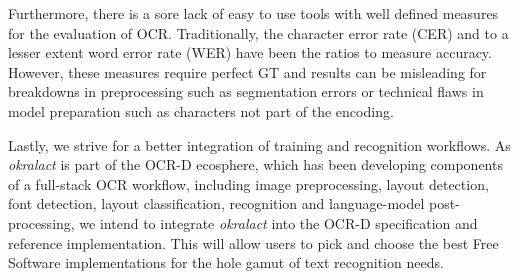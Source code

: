 \documentclass[conference]{IEEEtran}
\begin{document}

Furthermore, there is a sore lack of easy to use tools with well
defined measures for the evaluation of OCR. Traditionally, the
character error rate (CER) and to a lesser extent word error rate
(WER) have been the ratios to measure accuracy. However, these
measures require perfect GT and results can be misleading for
breakdowns in preprocessing such as segmentation errors or
technical flaws in model preparation such as characters not part
of the encoding.



Lastly, we strive for a better integration of training and
recognition workflows. As \textit{okralact} is part of the OCR-D
ecosphere, which has been developing components of a full-stack
OCR workflow, including image preprocessing, layout detection, font
detection, layout classification, recognition and language-model
post-processing, we intend to integrate \textit{okralact} into the
OCR-D specification and reference implementation. This will allow
users to pick and choose the best Free Software implementations for
the hole gamut of text recognition needs.




%
%
%



\end{document}
